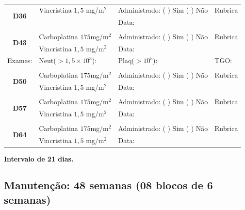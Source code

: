 \documentclass[11pt,a4paper,oldfontcommands]{memoir}
\begin{document}
\begin{center}
\begin{table}[H]
\begin{tabular}{p{1.3cm}p{4.9cm}|p{4.7cm}|p{3cm}}
    \hline
    \multicolumn{1}{c|}{\multirow{2}{*}{\textbf{D36}}}&{Vincristina \(1,5\) mg/m\(^2\)}&{Administrado: (  ) Sim (  ) Não}&{Rubrica}\\
    \multicolumn{1}{c|}{}&&{Data:}&\\
    \hline
    \\
    \hline
    \multicolumn{1}{c|}{\multirow{2}{*}{\textbf{D43}}}&{Carboplatina \(175\)mg/m\(^2\)}&{Administrado: (  ) Sim (  ) Não}&{Rubrica}\\
    \multicolumn{1}{c|}{}&{Vincristina \(1,5\) mg/m\(^2\)}&{Data:}&\\
    \hline
    \multicolumn{1}{c|}{Exames:}&{Neut(\(>1,5\times10^3\)):}&{Plaq(\(>10^5\)):}&{TGO:}
    \\
    \hline
    \\
	\hline
    \multicolumn{1}{c|}{\multirow{2}{*}{\textbf{D50}}}&{Carboplatina \(175\)mg/m\(^2\)}&{Administrado: (  ) Sim (  ) Não}&{Rubrica}\\
    \multicolumn{1}{c|}{}&{Vincristina \(1,5\) mg/m\(^2\)}&{Data:}&\\
    \hline
    \\
    \hline
    \multicolumn{1}{c|}{\multirow{2}{*}{\textbf{D57}}}&{Carboplatina \(175\)mg/m\(^2\)}&{Administrado: (  ) Sim (  ) Não}&{Rubrica}\\
    \multicolumn{1}{c|}{}&{Vincristina \(1,5\) mg/m\(^2\)}&{Data:}&\\
    \hline
    \\
    \hline
    \multicolumn{1}{c|}{\multirow{2}{*}{\textbf{D64}}}&{Carboplatina \(175\)mg/m\(^2\)}&{Administrado: (  ) Sim (  ) Não}&{Rubrica}\\
    \multicolumn{1}{c|}{}&{Vincristina \(1,5\) mg/m\(^2\)}&{Data:}&\\
    \hline
\end{tabular}
\end{table}
\textbf{Intervalo de 21 dias.}
\end{center}

\subsection{Manutenção: 48 semanas (08 blocos de 6 semanas)}
\end{document}
